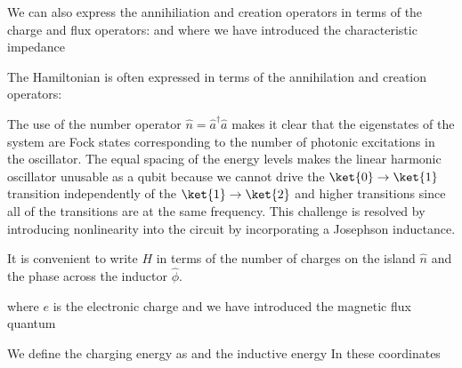 We can also express the annihiliation and creation operators in terms of the charge and flux operators:
and
where we have introduced the characteristic impedance

The Hamiltonian is often expressed in terms of the annihilation and creation operators:

\noindent
The use of the number operator $\hat{n} = \hat{a}^\dagger \hat{a}$ makes it clear that the eigenstates of the system are Fock states corresponding to the number
of photonic excitations in the oscillator.
The equal spacing of the energy levels makes the linear harmonic oscillator unusable as a qubit because we cannot drive the
$\ket{0} \rightarrow \ket{1}$ transition independently of the $\ket{1} \rightarrow \ket{2}$ and higher transitions since all of the transitions are at the same frequency.
This challenge is resolved by introducing nonlinearity into the circuit by incorporating a Josephson inductance.

It is convenient to write $H$ in terms of the number of charges on the island $\hat{n}$ and the phase across the inductor $\hat{\phi}$.


where $e$ is the electronic charge and we have introduced the magnetic flux quantum

\noindent
We define the charging energy as
and the inductive energy
In these coordinates


